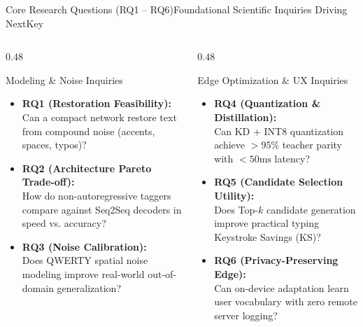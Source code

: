 \documentclass[aspectratio=169,10pt]{beamer}
\begin{document}
\begin{frame}{Core Research Questions (RQ1 -- RQ6)}{Foundational Scientific Inquiries Driving NextKey}
  \begin{columns}[T]
    \begin{column}{0.48\textwidth}
      \begin{block}{Modeling \& Noise Inquiries}
        \begin{itemize}\setlength{\itemsep}{4pt}\footnotesize
          \item \textbf{RQ1 (Restoration Feasibility):}\\
            Can a compact network restore text from compound noise (accents, spaces, typos)?
          \item \textbf{RQ2 (Architecture Pareto Trade-off):}\\
            How do non-autoregressive taggers compare against Seq2Seq decoders in speed vs. accuracy?
          \item \textbf{RQ3 (Noise Calibration):}\\
            Does QWERTY spatial noise modeling improve real-world out-of-domain generalization?
        \end{itemize}
      \end{block}
    \end{column}

    \begin{column}{0.48\textwidth}
      \begin{block}{Edge Optimization \& UX Inquiries}
        \begin{itemize}\setlength{\itemsep}{4pt}\footnotesize
          \item \textbf{RQ4 (Quantization \& Distillation):}\\
            Can KD + INT8 quantization achieve $>95\%$ teacher parity with $<50\text{ms}$ latency?
          \item \textbf{RQ5 (Candidate Selection Utility):}\\
            Does Top-$k$ candidate generation improve practical typing Keystroke Savings (KS)?
          \item \textbf{RQ6 (Privacy-Preserving Edge):}\\
            Can on-device adaptation learn user vocabulary with zero remote server logging?
        \end{itemize}
      \end{block}
    \end{column}
  \end{columns}
\end{frame}
\end{document}
